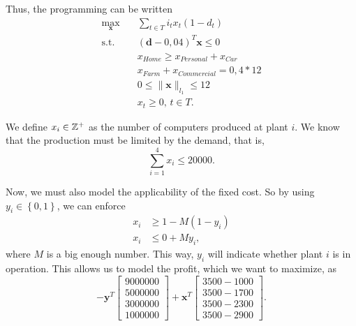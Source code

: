 \documentclass[a4paper]{report}
\begin{document}
Thus, the programming can be written
\begin{align*}
    \max_{\bm{x}} \quad & \sum_{t \in T} i_t x_t \left( 1-d_t \right) \\
    \textrm{s.t.} \quad & \left( \bm{d} - 0,04 \right)^{T} \bm{x} \le 0 \\
      & x_{Home} \ge  x_{Personal} + x_{Car} \\
      & x_{Farm} + x_{Commercial} = 0,4 * 12 \\
      & 0\le \|\bm{x}\|_{l_1} \le 12 \\
	  & x_t \ge 0,\, t \in  T
.\end{align*}


We define $x_i \in \mathbb{Z}^{+}$ as the number of computers produced at plant $i$. We know that the production must be limited by the demand, that is, \[
\sum_{i=1}^{4} x_i \le 20 000
.\]

Now, we must also model the applicability of the fixed cost. So by using $y_i \in \left\{ 0,1 \right\} $, we can enforce
\begin{align*}
    x_i &\ge 1 - M \left( 1-y_i \right) \\
    x_i &\le 0 + M y_i 
,\end{align*}
where $M$ is a big enough number. This way, $y_i$ will indicate whether plant $i$ is in operation. This allows us to model the profit, which we want to maximize, as \[
-\bm{y}^{T} \begin{bmatrix} 9000000 \\ 5000000 \\ 3000000 \\ 1000000 \end{bmatrix} + \bm{x}^{T}\begin{bmatrix} 3500 - 1000 \\ 3500 - 1700 \\ 3500-2300 \\ 3500-2900 \end{bmatrix} 
.\] 
\end{document}
